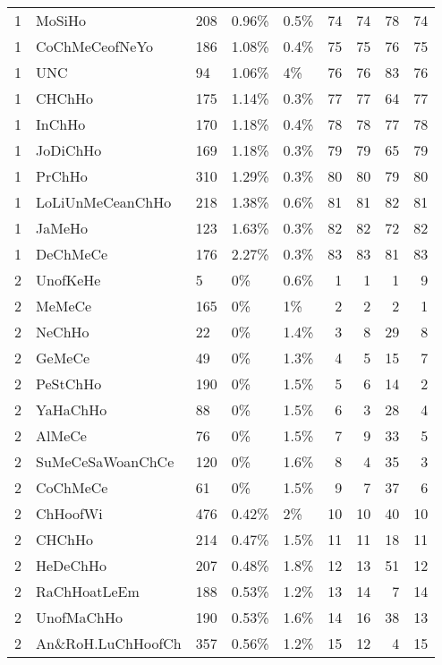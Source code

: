 \begin{longtable}{lllllrrrr}
  1 & MoSiHo & 208 & 0.96\% & 0.5\% &  74 &  74 &  78 &  74 \\ 
  1 & CoChMeCeofNeYo & 186 & 1.08\% & 0.4\% &  75 &  75 &  76 &  75 \\ 
  1 & UNC & 94 & 1.06\% & 4\% &  76 &  76 &  83 &  76 \\ 
  1 & CHChHo & 175 & 1.14\% & 0.3\% &  77 &  77 &  64 &  77 \\ 
  1 & InChHo & 170 & 1.18\% & 0.4\% &  78 &  78 &  77 &  78 \\ 
  1 & JoDiChHo & 169 & 1.18\% & 0.3\% &  79 &  79 &  65 &  79 \\ 
  1 & PrChHo & 310 & 1.29\% & 0.3\% &  80 &  80 &  79 &  80 \\ 
  1 & LoLiUnMeCeanChHo & 218 & 1.38\% & 0.6\% &  81 &  81 &  82 &  81 \\ 
  1 & JaMeHo & 123 & 1.63\% & 0.3\% &  82 &  82 &  72 &  82 \\ 
  1 & DeChMeCe & 176 & 2.27\% & 0.3\% &  83 &  83 &  81 &  83 \\ 
  2 & UnofKeHe & 5 & 0\% & 0.6\% &   1 &   1 &   1 &   9 \\ 
  2 & MeMeCe & 165 & 0\% & 1\% &   2 &   2 &   2 &   1 \\ 
  2 & NeChHo & 22 & 0\% & 1.4\% &   3 &   8 &  29 &   8 \\ 
  2 & GeMeCe & 49 & 0\% & 1.3\% &   4 &   5 &  15 &   7 \\ 
  2 & PeStChHo & 190 & 0\% & 1.5\% &   5 &   6 &  14 &   2 \\ 
  2 & YaHaChHo & 88 & 0\% & 1.5\% &   6 &   3 &  28 &   4 \\ 
  2 & AlMeCe & 76 & 0\% & 1.5\% &   7 &   9 &  33 &   5 \\ 
  2 & SuMeCeSaWoanChCe & 120 & 0\% & 1.6\% &   8 &   4 &  35 &   3 \\ 
  2 & CoChMeCe & 61 & 0\% & 1.5\% &   9 &   7 &  37 &   6 \\ 
  2 & ChHoofWi & 476 & 0.42\% & 2\% &  10 &  10 &  40 &  10 \\ 
  2 & CHChHo & 214 & 0.47\% & 1.5\% &  11 &  11 &  18 &  11 \\ 
  2 & HeDeChHo & 207 & 0.48\% & 1.8\% &  12 &  13 &  51 &  12 \\ 
  2 & RaChHoatLeEm & 188 & 0.53\% & 1.2\% &  13 &  14 &   7 &  14 \\ 
  2 & UnofMaChHo & 190 & 0.53\% & 1.6\% &  14 &  16 &  38 &  13 \\ 
  2 & An\&RoH.LuChHoofCh & 357 & 0.56\% & 1.2\% &  15 &  12 &   4 &  15 \\ 

\end{longtable}
